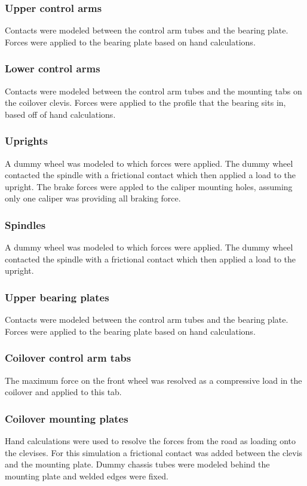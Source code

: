 \documentclass[10pt]{article}
\begin{document}
\subsubsection{Upper control arms}
Contacts were modeled between the control arm tubes and the bearing plate. Forces were applied to the bearing plate based on hand calculations.

\subsubsection{Lower control arms}
Contacts were modeled between the control arm tubes and the mounting tabs on the coilover clevis. Forces were applied to the profile that the bearing sits in, based off of hand calculations.

\subsubsection{Uprights}
A dummy wheel was modeled to which forces were applied. The dummy wheel contacted the spindle with a frictional contact which then applied a load to the upright. The brake forces were appled to the caliper mounting holes, assuming only one caliper was providing all braking force.

\subsubsection{Spindles}
A dummy wheel was modeled to which forces were applied. The dummy wheel contacted the spindle with a frictional contact which then applied a load to the upright.

\subsubsection{Upper bearing plates}
Contacts were modeled between the control arm tubes and the bearing plate. Forces were applied to the bearing plate based on hand calculations.

\subsubsection{Coilover control arm tabs}
The maximum force on the front wheel was resolved as a compressive load in the coilover and applied to this tab.

\subsubsection{Coilover mounting plates}
Hand calculations were used to resolve the forces from the road as loading onto the clevises. For this simulation a frictional contact was added between the clevis and the mounting plate. Dummy chassis tubes were modeled behind the mounting plate and welded edges were fixed.
\end{document}
